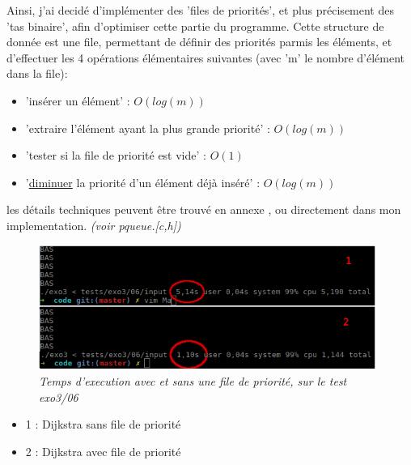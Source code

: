 \documentclass[10pt]{article}
\begin{document}
				Ainsi, j'ai decidé d'implémenter des 'files de priorités', et plus précisement des 'tas binaire', afin
				d'optimiser cette partie du programme.
				Cette structure de donnée est une file, permettant de définir des priorités parmis les éléments,
				et d'effectuer les 4 opérations élémentaires suivantes (avec 'm' le nombre d'élément dans la file):
				\begin{itemize}[label=-]
					\item 'insérer un élément' : \(O(log(m))\)
					\item 'extraire l'élément ayant la plus grande priorité' : \({O(log(m))}\)
					\item 'tester si la file de priorité est vide' : \(O(1)\)
					\item '\underline{diminuer} la priorité d'un élément déjà inséré' : \(O(log(m))\)
				\end{itemize}
				les détails techniques peuvent être trouvé en annexe \cite{binary_heap},
				ou directement dans mon implementation. \textit{(voir pqueue.[c,h])}
				
				\begin{figure}[H]
					\begin{center}
						\includegraphics[width=11cm,height=\textheight,keepaspectratio]{./images/performances.png}
					\end{center}
					\caption{\textit{Temps d'execution avec et sans une file de priorité, sur le test exo3/06}}
				\end{figure}
								
				\begin{itemize}[label=-]
					\setlength\itemsep{0.1em}
					\item 1 : Dijkstra sans file de priorité
					\item 2 : Dijkstra avec file de priorité
				\end{itemize}
\end{document}
